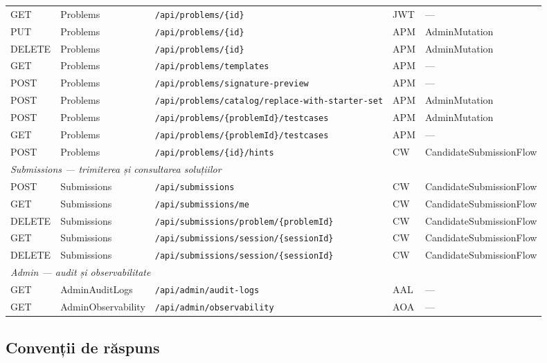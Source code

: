\begin{table}[ht]
\begin{tabular}{llp{3.8cm}p{2.8cm}p{2.4cm}}
GET  & Problems & \texttt{/api/problems/\{id\}}                     & JWT & — \\
PUT  & Problems & \texttt{/api/problems/\{id\}}                     & APM & AdminMutation \\
DELETE & Problems & \texttt{/api/problems/\{id\}}                   & APM & AdminMutation \\
GET  & Problems & \texttt{/api/problems/templates}                  & APM & — \\
POST & Problems & \texttt{/api/problems/signature-preview}          & APM & — \\
POST & Problems & \texttt{/api/problems/catalog/replace-with-starter-set} & APM & AdminMutation \\
POST & Problems & \texttt{/api/problems/\{problemId\}/testcases}    & APM & AdminMutation \\
GET  & Problems & \texttt{/api/problems/\{problemId\}/testcases}    & APM & — \\
POST & Problems & \texttt{/api/problems/\{id\}/hints}               & CW  & CandidateSubmissionFlow \\
\hline
\multicolumn{5}{l}{\textit{Submissions — trimiterea și consultarea soluțiilor}} \\
\hline
POST   & Submissions & \texttt{/api/submissions}                         & CW  & CandidateSubmissionFlow \\
GET    & Submissions & \texttt{/api/submissions/me}                      & CW  & CandidateSubmissionFlow \\
DELETE & Submissions & \texttt{/api/submissions/problem/\{problemId\}}   & CW  & CandidateSubmissionFlow \\
GET    & Submissions & \texttt{/api/submissions/session/\{sessionId\}}   & CW  & CandidateSubmissionFlow \\
DELETE & Submissions & \texttt{/api/submissions/session/\{sessionId\}}   & CW  & CandidateSubmissionFlow \\
\hline
\multicolumn{5}{l}{\textit{Admin — audit și observabilitate}} \\
\hline
GET & AdminAuditLogs      & \texttt{/api/admin/audit-logs}     & AAL & — \\
GET & AdminObservability  & \texttt{/api/admin/observability}  & AOA & — \\
\hline
\end{tabular}
\end{table}

\subsection{Convenții de răspuns}

